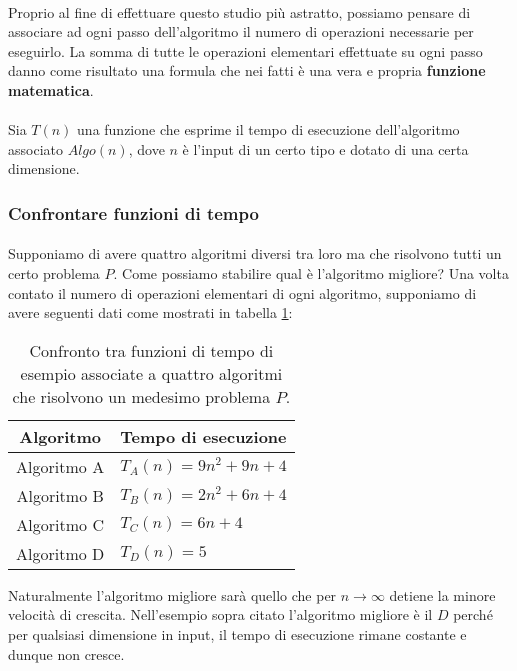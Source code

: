 \documentclass[11pt,a4paper,oneside]{article}
\begin{document}
\paragraph*{}Proprio al fine di effettuare questo studio più astratto, possiamo pensare di associare ad ogni passo dell'algoritmo il numero di operazioni necessarie per eseguirlo. La somma di tutte le operazioni elementari effettuate su ogni passo danno come risultato una formula che nei fatti è una vera e propria \textbf{funzione matematica}.
\paragraph*{}Sia $T(n)$ una funzione che esprime il tempo di esecuzione dell'algoritmo associato $Algo(n)$, dove $n$ è l'input di un certo tipo e dotato di una certa dimensione.
\subsubsection{Confrontare funzioni di tempo}
\paragraph*{}Supponiamo di avere quattro algoritmi diversi tra loro ma che risolvono tutti un certo problema $P$. Come possiamo stabilire qual è l'algoritmo migliore? Una volta contato il numero di operazioni elementari di ogni algoritmo, supponiamo di avere seguenti dati come mostrati in tabella \ref{tab:algos}:

\begin{table}[h]
	\centering
	\begin{tabular}{|c|l|}
		\hline
		\textbf{Algoritmo}&\textbf{Tempo di esecuzione}\\\hline 
		Algoritmo A &  $T_A(n) = 9n^2+9n+4$ \\ 
		Algoritmo B &  $T_B(n) = 2n^2+6n+4$\\ 
		Algoritmo C &  $T_C(n) = 6n+4$\\ 
		Algoritmo D &  $T_D(n) = 5$ \\ \hline
	\end{tabular}
	\caption{Confronto tra funzioni di tempo di esempio associate a quattro algoritmi che risolvono un medesimo problema $P$.}
	\label{tab:algos}
\end{table}

Naturalmente l'algoritmo migliore sarà quello che per $n \to \infty$ detiene la minore velocità di crescita. Nell'esempio sopra citato l'algoritmo migliore è il $D$ perché per qualsiasi dimensione in input, il tempo di esecuzione rimane costante e dunque non cresce.
\end{document}
